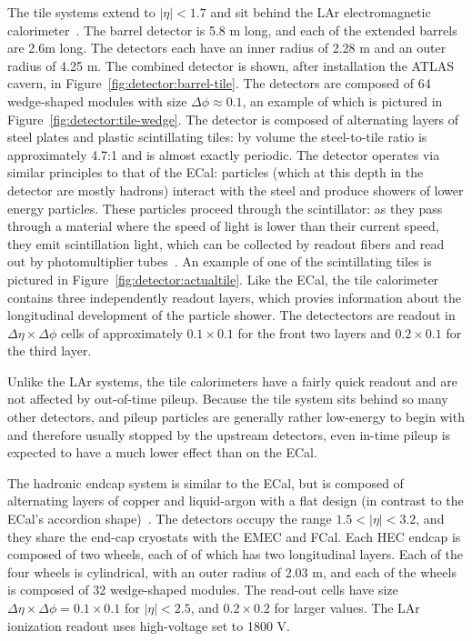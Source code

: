 The tile systems extend to $|\eta| < 1.7$ and sit behind the LAr electromagnetic calorimeter~\cite{ATLASPaper,Tile}. The barrel detector is 5.8 m long, and each of the extended barrels are 2.6m long. The detectors each have an inner radius of 2.28 m and an outer radius of 4.25 m. The combined detector is shown, after installation the ATLAS cavern, in Figure~\ref{fig:detector:barrel-tile}. The detectors are composed of 64 wedge-shaped modules with size $\Delta\phi \approx 0.1$, an example of which is pictured in Figure~\ref{fig:detector:tile-wedge}. The detector is composed of alternating layers of steel plates and plastic scintillating tiles: by volume the steel-to-tile ratio is approximately 4.7:1 and is almost exactly periodic. The detector operates via similar principles to that of the ECal: particles (which at this depth in the detector are mostly hadrons) interact with the steel and produce showers of lower energy particles. These particles proceed through the scintillator: as they pass through a material where the speed of light is lower than their current speed, they emit scintillation light, which can be collected by readout fibers and read out by photomultiplier tubes~\cite{Wigmans,Detectors,Tile}.  An example of one of the scintillating tiles is pictured in Figure~\ref{fig:detector:actualtile}. Like the ECal, the tile calorimeter contains three independently readout layers, which provies information about the longitudinal development of the particle shower. The detectectors are readout in $\Delta \eta \times \Delta\phi$ cells of approximately  $0.1 \times 0.1$ for the front two layers  and $0.2 \times 0.1$ for the third layer.

Unlike the LAr systems, the tile calorimeters have a fairly quick readout and are not affected by out-of-time pileup. Because the tile system sits behind so many other detectors, and pileup particles are generally rather low-energy to begin with and therefore usually stopped by the upstream detectors, even in-time pileup is expected to have a much lower effect than on the ECal.

The hadronic endcap system is similar to the ECal, but is composed of alternating layers of copper and liquid-argon with a flat design (in contrast to the ECal's accordion shape)~\cite{ATLASPaper}. The detectors occupy the range $1.5 < |\eta| < 3.2$, and they share the end-cap cryostats with the EMEC and FCal.  Each HEC endcap is composed of two wheels, each of of which has two longitudinal layers. Each of the four wheels is cylindrical, with an outer radius of 2.03 m, and each of the wheels is composed of 32 wedge-shaped modules. The read-out cells have size $\Delta \eta \times \Delta\phi = 0.1 \times 0.1$ for $|\eta| < 2.5$, and $0.2 \times 0.2$ for larger values. The LAr ionization readout uses high-voltage set to 1800 V.

